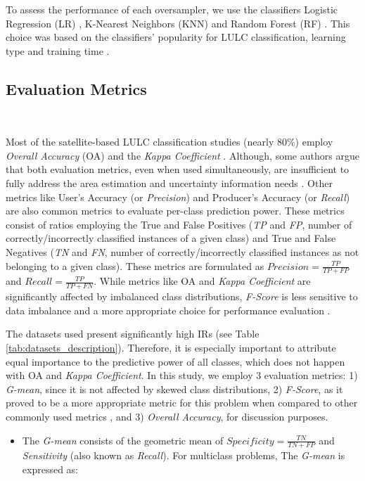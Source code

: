 \documentclass[authoryear,preprint,12pt]{elsarticle}
\begin{document}
\begin{linenumbers}
To assess the performance of each oversampler, we use the classifiers Logistic
Regression (LR) \citep{Nelder1972}, K-Nearest Neighbors (KNN)
\citep{Cover1967} and Random Forest (RF)
\citep{Liaw2002}. This choice was based on the classifiers' popularity for LULC
classification, learning type and training time \citep{Maxwell2018,Gavade2019}.

\subsection{Evaluation Metrics}~\label{sec:evaluation-metrics}

Most of the satellite-based LULC classification studies (nearly 80\%) employ
\textit{Overall Accuracy} (OA) and the \textit{Kappa Coefficient}
\citep{Gavade2019}. Although, some authors argue that both evaluation metrics,
even when used simultaneously, are insufficient to fully address the area
estimation and uncertainty information needs \citep{Olofsson2013,Pontius2011}.
Other metrics like User's Accuracy (or \textit{Precision}) and Producer's
Accuracy (or \textit{Recall}) are also common metrics to evaluate per-class
prediction power. These metrics consist of ratios employing the True and False
Positives (\textit{TP} and \textit{FP}, number of correctly/incorrectly
classified instances of a given class) and True and
False Negatives (\textit{TN} and \textit{FN}, number of correctly/incorrectly
classified instances as not belonging to a given
class). These metrics are formulated as $Precision = \frac{TP}{TP+FP}$ and
$Recall = \frac{TP}{TP+FN}$. While metrics like OA and \textit{Kappa
Coefficient} are significantly affected by imbalanced class distributions,
\textit{F-Score} is less sensitive to data imbalance and a more appropriate
choice for performance evaluation \citep{Jeni2013}.

The datasets used present significantly high IRs (see Table
\ref{tab:datasets_description}). Therefore, it is especially important to
attribute equal importance to the predictive power of all classes, which does
not happen with OA and \textit{Kappa Coefficient}. In this study, we employ 3
evaluation metrics: 1) \textit{G-mean}, since it is not affected by skewed class
distributions, 2) \textit{F-Score}, as it proved to be a more appropriate metric
for this problem when compared to other commonly used metrics \citep{Jeni2013},
and 3) \textit{Overall Accuracy}, for discussion purposes.

\begin{itemize}
    \item The \textit{G-mean} consists of the geometric mean of $Specificity =
        \frac{TN}{TN + FP}$ and \textit{Sensitivity} (also known as
        \textit{Recall}). For multiclass problems, The \textit{G-mean} is
        expressed as:


\end{itemize}
\end{linenumbers}
\end{document}
